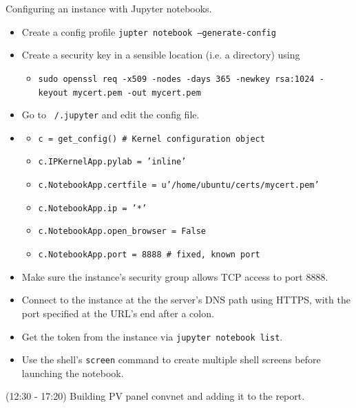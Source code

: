 \documentclass[idxtotoc,hyperref,openany]{labbook} %
\begin{document}
Configuring an instance with Jupyter notebooks.
\begin{itemize}
	\item Create a config profile \texttt{jupter notebook --generate-config}
	\item Create a security key in a sensible location (i.e. a directory) using 
	\begin{itemize}
	\item[] \texttt{sudo openssl req -x509 -nodes -days 365 -newkey rsa:1024 -keyout mycert.pem -out mycert.pem}
	\end{itemize}
	\item Go to \texttt{~/.jupyter} and edit the config file.
	\item[]
	\begin{itemize}
	\item[] \texttt{c = get\_config() \# Kernel configuration object}
	\item[] \texttt{c.IPKernelApp.pylab = 'inline' } 
	\item[] \texttt{c.NotebookApp.certfile = u'/home/ubuntu/certs/mycert.pem'}
	\item[] \texttt{c.NotebookApp.ip = '*' }
	\item[] \texttt{c.NotebookApp.open\_browser = False  }
	\item[] \texttt{c.NotebookApp.port = 8888 \# fixed, known port}
	\end{itemize}
	\item Make sure the instance's security group allows TCP access to port 8888.
	\item Connect to the instance at the the server's DNS path using HTTPS, with the port specified at the URL's end after a colon.
	\item Get the token from the instance via \texttt{jupyter notebook list}.
	\item Use the shell's \texttt{screen} command to create multiple shell screens before launching the notebook.
\end{itemize}

(12:30 - 17:20) Building PV panel convnet and adding it to the report.
\end{document}
